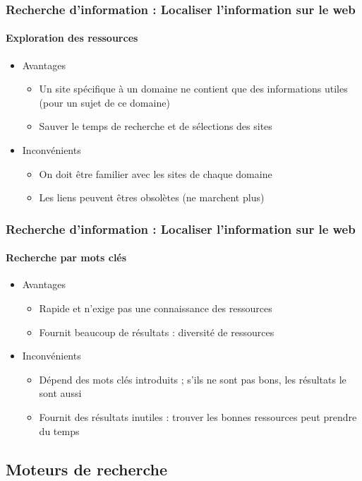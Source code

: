 \documentclass[xcolor=table]{beamer}
\begin{document}
\begin{frame}
\frametitle{Recherche d'information : Localiser l'information sur le web}
\framesubtitle{Exploration des ressources}

\begin{itemize}
	\item Avantages
	\begin{itemize}
		\item Un site spécifique à un domaine ne contient que des informations utiles (pour un sujet de ce domaine) 
		\item Sauver le temps de recherche et de sélections des sites 
	\end{itemize}
	\item Inconvénients
	\begin{itemize}
		\item On doit être familier avec les sites de chaque domaine 
		\item Les liens peuvent êtres obsolètes (ne marchent plus)
	\end{itemize}
\end{itemize} 

\end{frame}


\begin{frame}
\frametitle{Recherche d'information : Localiser l'information sur le web}
\framesubtitle{Recherche par mots clés}

\begin{itemize}
	\item Avantages
	\begin{itemize}
		\item Rapide et n'exige pas une connaissance des ressources
		\item Fournit beaucoup de résultats : diversité de ressources
	\end{itemize}
	\item Inconvénients
	\begin{itemize}
		\item Dépend des mots clés introduits ; s'ils ne sont pas bons, les résultats le sont aussi
		\item Fournit des résultats inutiles : trouver les bonnes ressources peut prendre du temps
	\end{itemize}
\end{itemize} 

\end{frame}


\subsection{Moteurs de recherche}
\end{document}
